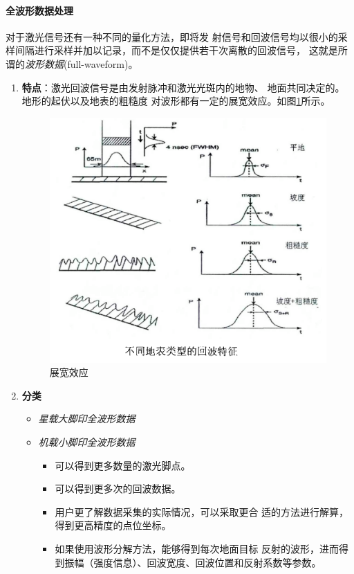 \paragraph{全波形数据处理}
对于激光信号还有一种不同的量化方法，即将发
射信号和回波信号均以很小的采样间隔进行采样并加以记录，而不是仅仅提供若干次离散的回波信号，
这就是所谓的\textit{波形数据}(full-waveform)。
\begin{enumerate}
	\item \textbf{特点}：激光回波信号是由发射脉冲和激光光斑内的地物、
		地面共同决定的。地形的起伏以及地表的粗糙度
		对波形都有一定的展宽效应。如图\ref{fig:展宽效应}所示。
		\begin{figure}[htbp]
			\centering
			\includegraphics[width=0.5\linewidth]{figure/Chapter6/展宽效应}
			\caption{展宽效应}
			\label{fig:展宽效应}
		\end{figure}
	\item \textbf{分类}
		\begin{itemize}
			\item \textit{星载大脚印全波形数据}
			\item \textit{机载小脚印全波形数据}
				\begin{itemize}
					\item 可以得到更多数量的激光脚点。
					\item 可以得到更多次的回波数据。
					\item 用户更了解数据采集的实际情况，可以采取更合 适的方法进行解算，得到更高精度的点位坐标。
					\item 如果使用波形分解方法，能够得到每次地面目标 反射的波形，进而得到振幅（强度信息）、回波宽度、回波位置和反射系数等参数。
				\end{itemize}
		\end{itemize}
\end{enumerate}

